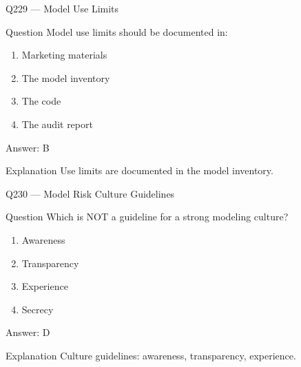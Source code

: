 \documentclass[aspectratio=169,8pt]{beamer}
\begin{document}
								\begin{frame}{Q229 --- Model Use Limits}
									\begin{block}{Question}
										Model use limits should be documented in:
										\begin{enumerate}
											\item Marketing materials
											\item The model inventory
											\item The code
											\item The audit report
										\end{enumerate}
									\end{block}
									\begin{exampleblock}{Answer: B}\end{exampleblock}
									\begin{block}{Explanation}
										Use limits are documented in the model inventory.
									\end{block}
								\end{frame}
								
								\begin{frame}{Q230 --- Model Risk Culture Guidelines}
									\begin{block}{Question}
										Which is NOT a guideline for a strong modeling culture?
										\begin{enumerate}
											\item Awareness
											\item Transparency
											\item Experience
											\item Secrecy
										\end{enumerate}
									\end{block}
									\begin{exampleblock}{Answer: D}\end{exampleblock}
									\begin{block}{Explanation}
										Culture guidelines: awareness, transparency, experience.
									\end{block}
								\end{frame}
								
\end{document}
